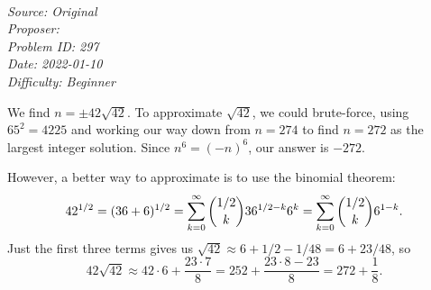 \SSbreak\\
\emph{Source: Original}\\
\emph{Proposer: \Pnjoy}\\
\emph{Problem ID: 297}\\
\emph{Date: 2022-01-10}\\
\emph{Difficulty: Beginner}\\
\SSbreak

\bigskip

\begin{solution}\hfil\medskip
  
    We find $n = \pm 42\sqrt{42}$. To approximate $\sqrt{42}$, we could brute-force, using 
    $65^2 = 4225$ and working our way down from $n = 274$ to find $n = 272$ as the largest 
    integer solution. Since $n^6 = (-n)^6$, our answer is $\boxed{-272}.$ \medskip

    However, a better way to approximate is to use the binomial theorem: 
    $$42^{1/2} = (36 + 6)^{1/2} = \sum_{k = 0}^\infty \dbinom{1/2}{k} 36^{1/2 - k}6^k = \sum_{k = 0}^\infty \dbinom{1/2}{k}6^{1 - k}.$$ 
    Just the first three terms gives us $\sqrt{42} \approx 6 + 1/2 - 1/48 = 6 + 23/48$, so 
    $$42\sqrt{42} \approx 42 \cdot 6 + \dfrac{23 \cdot 7}{8} = 252 + \dfrac{23 \cdot 8 - 23}{8} = 272 + \dfrac{1}{8}.$$
\end{solution}\bigskip
